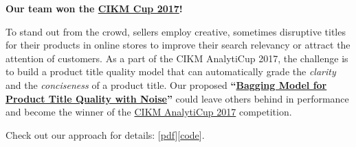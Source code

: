 \documentclass[sigconf]{acmart}
\begin{document}
\textbf{Our team won the \href{http://cikm2017.org/CIKM_AnalytiCup_task3.html}{CIKM Cup 2017}!}

To stand out from the crowd, sellers employ creative, sometimes disruptive titles for their products in online stores to improve their search relevancy or attract the attention of customers. As a part of the CIKM AnalytiCup 2017, the challenge is to build a product title quality model that can automatically grade the \textit{clarity} and the \textit{conciseness} of a product title. Our proposed \textbf{``\href{}{Bagging Model for Product Title Quality with Noise}''} could leave others behind in performance and become the winner of the \href{http://cikm2017.org/CIKM_AnalytiCup_task3.html}{CIKM AnalytiCup 2017} competition.

Check out our approach for details: [\href{}{pdf}][\href{}{code}].
\end{document}
